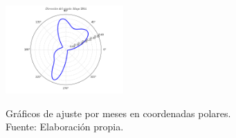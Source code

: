 \begin{figure}[ht!]
\begin{center}
{            \label{fig:polar_may_2014}
            \includegraphics[width=0.4\textwidth]{figures/direction_mayo_2014.png}
        }
    \end{center}
    \caption{Gráficos de ajuste por meses en coordenadas polares.\\ Fuente: Elaboración propia.}
    \label{fig:PLOT_MONTHS_1}
\end{figure}

